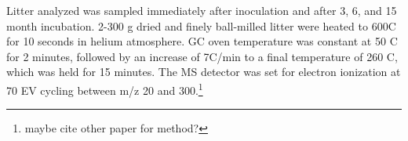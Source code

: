 \documentclass[authoryear,preprint,review,12pt]{elsarticle}
\begin{document}
                                                                                                                                                                                                                                                                                                                                                                                                                                                                                                                                                                                                                                                                                                                                                                                                                                                                                                                                                                                                                                                                                                                              Litter analyzed was sampled immediately after inoculation and after 3, 6, and 15 month incubation. 2-300 \textmu g dried and finely ball-milled litter were heated to 600\textdegree C for 10 seconds in helium atmosphere. GC oven temperature was constant at 50 \textdegree C for 2 minutes, followed by an increase of 7\textdegree C/min to a final temperature of 260 \textdegree C, which was held for 15 minutes. The MS detector was set for electron ionization at 70 EV cycling between m/z 20 and 300.\footnote{maybe cite other paper for method?}
\end{document}
